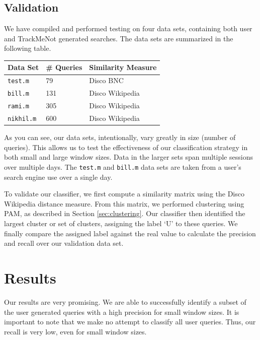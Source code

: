 \documentclass{llncs}
\begin{document}
\begin{multicols}{2}
\subsection{Validation}
We have compiled and performed testing on four data sets, containing
both user and TrackMeNot generated searches. The data sets are
summarized in the following table.

\bigskip
\begin{centering}
    \begin{tabular}{ | l | l | l |}
    \hline
    {\bf Data Set} & {\bf \# Queries} & {\bf Similarity Measure} \\ \hline
    \texttt{test.m} & 79 & Disco BNC \\ \hline
    \texttt{bill.m} & 131 & Disco Wikipedia \\ \hline
    \texttt{rami.m} & 305 & Disco Wikipedia \\ \hline
    \texttt{nikhil.m} & 600 & Disco Wikipedia \\ \hline
    \end{tabular}
\end{centering}
\bigskip

As you can see, our data sets, intentionally, vary greatly in size
(number of queries). This allows us to test the effectiveness of our
classification strategy in both small and large window sizes. Data in
the larger sets span multiple sessions over multiple days. The
\texttt{test.m} and \texttt{bill.m} data sets are taken from a user's
search engine use over a single day.

To validate our classifier, we first compute a similarity matrix
using the Disco Wikipedia distance measure. From this matrix, we
performed clustering using PAM, as described in Section
\ref{sec:clustering}. Our classifier then identified the largest
cluster or set of clusters, assigning the label `U' to these
queries. We finally compare the assigned label against the real value
to calculate the precision and recall over our validation data set.

\section{Results}
\label{sec:results}

Our results are very promising. We are able to successfully identify a
subset of the user generated queries with a high precision for small
window sizes. It is important to note that we make no attempt to
classify all user queries. Thus, our recall is very low, even for
small window sizes.


\end{multicols}
\end{document}
